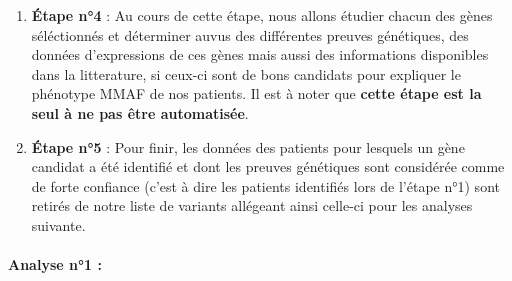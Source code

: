 \documentclass[12pt,twoside]{reedthesis}
\theoremstyle{definition}
\theoremstyle{definition}
\theoremstyle{remark}
\begin{document}
  \begin{enumerate}
  \def\labelenumi{\arabic{enumi}.}
  \setcounter{enumi}{3}
  \item
    \textbf{Étape n°4} : Au cours de cette étape, nous allons étudier
    chacun des gènes séléctionnés et déterminer auvus des différentes
    preuves génétiques, des données d'expressions de ces gènes mais aussi
    des informations disponibles dans la litterature, si ceux-ci sont de
    bons candidats pour expliquer le phénotype MMAF de nos patients. Il
    est à noter que \textbf{cette étape est la seul à ne pas être
    automatisée}.
  \item
    \textbf{Étape n°5} : Pour finir, les données des patients pour
    lesquels un gène candidat a été identifié et dont les preuves
    génétiques sont considérée comme de forte confiance (c'est à dire les
    patients identifiés lors de l'étape n°1) sont retirés de notre liste
    de variants allégeant ainsi celle-ci pour les analyses suivante.
  \end{enumerate}
  
  \newpage  
  
  \paragraph{Analyse n°1 :}\label{analyse-n1}
  
\end{document}
